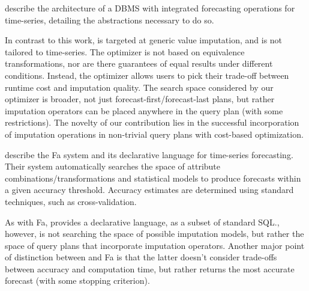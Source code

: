 \textcite*{fischer2013towards} describe the architecture of a DBMS with integrated forecasting operations for time-series, detailing
the abstractions necessary to do so.

In contrast to this work, \ProjectName{} is targeted at generic value imputation, and is not tailored to time-series.
The optimizer is not based on equivalence transformations, nor are there guarantees of equal
results under different conditions. Instead, the optimizer allows users to pick their trade-off between
runtime cost and imputation quality. The search space considered by our optimizer is broader, not just
forecast-first/forecast-last plans, but rather imputation operators can be placed anywhere in the query plan
(with some restrictions). The novelty of our contribution lies in the successful incorporation of
imputation operations in non-trivial query plans with cost-based optimization.

\textcite*{duan2007processing} describe the Fa system and its declarative language for time-series forecasting. Their
system automatically searches the space of attribute combinations/transformations and statistical models
to produce forecasts within a given accuracy threshold. Accuracy estimates are determined using
standard techniques, such as cross-validation. 

As with Fa, \ProjectName{} provides a declarative language, as
a subset of standard SQL.\@ \ProjectName{}, however, is not searching the space of possible
imputation models, but rather the space of query plans that incorporate imputation operators. Another major point
of distinction between \ProjectName{} and Fa is that the latter doesn't consider trade-offs between accuracy and computation time, but rather returns the most accurate forecast (with some stopping criterion).



